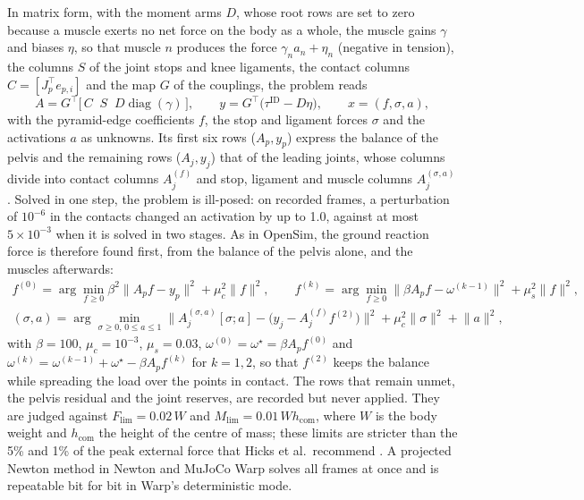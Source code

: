 \documentclass[11pt]{article}
\begin{document}
In matrix form, with the moment arms $D$, whose root rows are set to zero
because a muscle exerts no net force on the body as a whole, the muscle gains $\gamma$ and biases $\eta$, so that muscle $n$
produces the force $\gamma_na_n+\eta_n$ (negative in tension), the columns $S$ of the joint stops and knee ligaments, the
contact columns $C=[J_p^{\top}e_{p,i}]$ and the map $G$ of the couplings, the problem reads
\begin{equation}
A=G^{\top}\bigl[\,C\;\;S\;\;D\operatorname{diag}(\gamma)\,\bigr],\qquad y=G^{\top}\bigl(\tau^{\mathrm{ID}}-D\eta\bigr),\qquad x=(f,\sigma,a),
\label{eq:so}
\end{equation}
with the pyramid-edge coefficients $f$, the stop and ligament forces $\sigma$ and the activations $a$ as unknowns. Its
first six rows ($A_p,y_p$) express the balance of the pelvis and the remaining rows ($A_j,y_j$) that of the leading
joints, whose columns divide into contact columns $A_j^{(f)}$ and stop, ligament and muscle columns $A_j^{(\sigma,a)}$.
Solved in one step, the problem is ill-posed: on recorded frames, a perturbation of $10^{-6}$ in the contacts changed an
activation by up to 1.0, against at most $5\times10^{-3}$ when it is solved in two stages. As in OpenSim, the ground
reaction force is therefore found first, from the balance of the pelvis alone, and the muscles afterwards:
\begin{equation}
\begin{gathered}
f^{(0)}=\arg\min_{f\ge0}\beta^2\lVert A_pf-y_p\rVert^2+\mu_c^2\lVert f\rVert^2,\qquad
f^{(k)}=\arg\min_{f\ge0}\lVert\beta A_pf-\omega^{(k-1)}\rVert^2+\mu_s^2\lVert f\rVert^2,\\
(\sigma,a)=\arg\min_{\sigma\ge0,\,0\le a\le1}\bigl\lVert A_j^{(\sigma,a)}[\sigma;a]-\bigl(y_j-A_j^{(f)}f^{(2)}\bigr)\bigr\rVert^2
+\mu_c^2\lVert\sigma\rVert^2+\lVert a\rVert^2,
\end{gathered}
\label{eq:stages}
\end{equation}
with $\beta=100$, $\mu_c=10^{-3}$, $\mu_s=0.03$, $\omega^{(0)}=\omega^\star=\beta A_pf^{(0)}$ and
$\omega^{(k)}=\omega^{(k-1)}+\omega^\star-\beta A_pf^{(k)}$ for $k=1,2$, so that $f^{(2)}$ keeps the balance while
spreading the load over the points in contact. The rows that remain unmet, the pelvis residual and the joint reserves,
are recorded but never applied. They are judged against $F_{\lim}=0.02\,W$ and $M_{\lim}=0.01\,W h_{\mathrm{com}}$, where
$W$ is the body weight and $h_{\mathrm{com}}$ the height of the centre of mass; these limits are stricter than the 5\%
and 1\% of the peak external force that Hicks et al.\ recommend \cite{hicks2015model}. A projected Newton method in
Newton and MuJoCo Warp \cite{newton,mujocowarp} solves all frames at once and is repeatable bit for bit in Warp's
deterministic mode.
\end{document}
